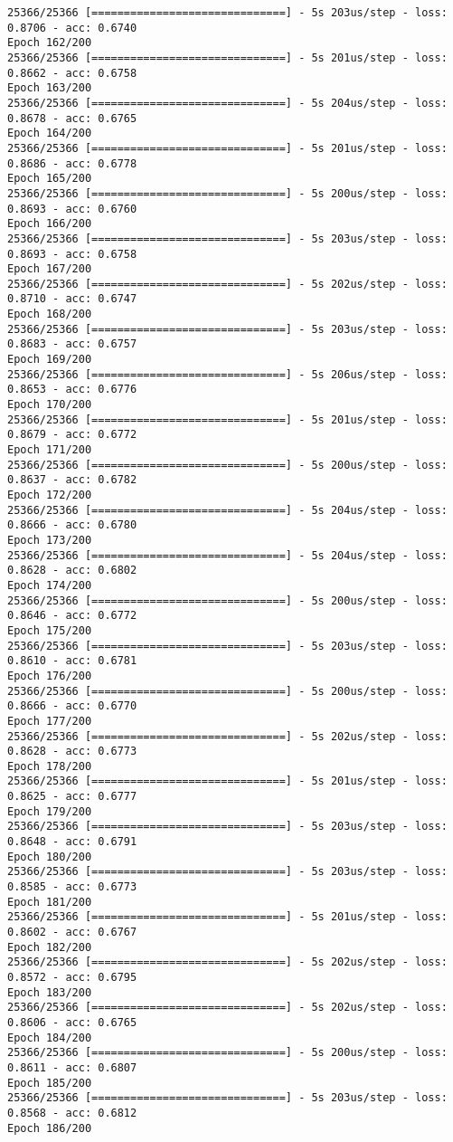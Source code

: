 \documentclass[11pt]{article}
\begin{document}
\begin{Verbatim}[commandchars=\\\{\}]
25366/25366 [==============================] - 5s 203us/step - loss: 0.8706 - acc: 0.6740
Epoch 162/200
25366/25366 [==============================] - 5s 201us/step - loss: 0.8662 - acc: 0.6758
Epoch 163/200
25366/25366 [==============================] - 5s 204us/step - loss: 0.8678 - acc: 0.6765
Epoch 164/200
25366/25366 [==============================] - 5s 201us/step - loss: 0.8686 - acc: 0.6778
Epoch 165/200
25366/25366 [==============================] - 5s 200us/step - loss: 0.8693 - acc: 0.6760
Epoch 166/200
25366/25366 [==============================] - 5s 203us/step - loss: 0.8693 - acc: 0.6758
Epoch 167/200
25366/25366 [==============================] - 5s 202us/step - loss: 0.8710 - acc: 0.6747
Epoch 168/200
25366/25366 [==============================] - 5s 203us/step - loss: 0.8683 - acc: 0.6757
Epoch 169/200
25366/25366 [==============================] - 5s 206us/step - loss: 0.8653 - acc: 0.6776
Epoch 170/200
25366/25366 [==============================] - 5s 201us/step - loss: 0.8679 - acc: 0.6772
Epoch 171/200
25366/25366 [==============================] - 5s 200us/step - loss: 0.8637 - acc: 0.6782
Epoch 172/200
25366/25366 [==============================] - 5s 204us/step - loss: 0.8666 - acc: 0.6780
Epoch 173/200
25366/25366 [==============================] - 5s 204us/step - loss: 0.8628 - acc: 0.6802
Epoch 174/200
25366/25366 [==============================] - 5s 200us/step - loss: 0.8646 - acc: 0.6772
Epoch 175/200
25366/25366 [==============================] - 5s 203us/step - loss: 0.8610 - acc: 0.6781
Epoch 176/200
25366/25366 [==============================] - 5s 200us/step - loss: 0.8666 - acc: 0.6770
Epoch 177/200
25366/25366 [==============================] - 5s 202us/step - loss: 0.8628 - acc: 0.6773
Epoch 178/200
25366/25366 [==============================] - 5s 201us/step - loss: 0.8625 - acc: 0.6777
Epoch 179/200
25366/25366 [==============================] - 5s 203us/step - loss: 0.8648 - acc: 0.6791
Epoch 180/200
25366/25366 [==============================] - 5s 203us/step - loss: 0.8585 - acc: 0.6773
Epoch 181/200
25366/25366 [==============================] - 5s 201us/step - loss: 0.8602 - acc: 0.6767
Epoch 182/200
25366/25366 [==============================] - 5s 202us/step - loss: 0.8572 - acc: 0.6795
Epoch 183/200
25366/25366 [==============================] - 5s 202us/step - loss: 0.8606 - acc: 0.6765
Epoch 184/200
25366/25366 [==============================] - 5s 200us/step - loss: 0.8611 - acc: 0.6807
Epoch 185/200
25366/25366 [==============================] - 5s 203us/step - loss: 0.8568 - acc: 0.6812
Epoch 186/200

\end{Verbatim}
\end{document}
